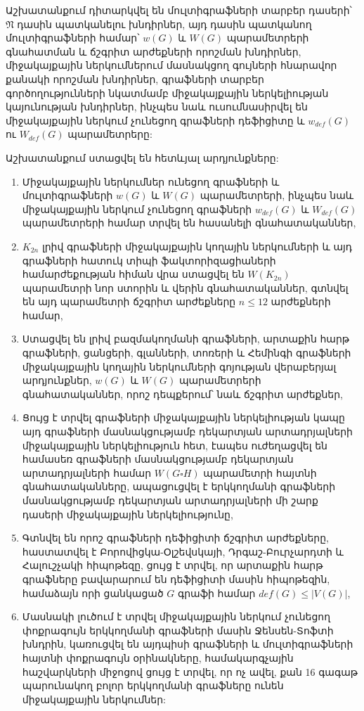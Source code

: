 Աշխատանքում դիտարկվել են մուլտիգրաֆների տարբեր դասերի՝ $\mathfrak{N}$ դասին պատկանելու խնդիրներ, այդ դասին պատկանող մուլտիգրաֆների համար՝ $w(G)$ և $W(G)$ պարամետրերի գնահատման և ճշգրիտ արժեքների որոշման խնդիրներ, միջակայքային ներկումներում մասնակցող գույների հնարավոր քանակի որոշման խնդիրներ, գրաֆների տարբեր գործողությունների նկատմամբ միջակայքային ներկելիության կայունության խնդիրներ, ինչպես նաև ուսումնասիրվել են միջակայքային ներկում չունեցող գրաֆների դեֆիցիտը և $w_{def}(G)$ ու $W_{def}(G)$ պարամետրերը:

Աշխատանքում ստացվել են հետևյալ արդյունքները:
\begin{enumerate}
\itemsep0em 
\item Միջակայքային ներկումներ ունեցող գրաֆների և մուլտիգրաֆների $w(G)$ և $W(G)$ պարամետրերի, ինչպես նաև միջակայքային ներկում չունեցող գրաֆների $w_{def}(G)$ և $W_{def}(G)$ պարամետրերի համար տրվել են հասանելի գնահատականներ,

\item $K_{2n}$ լրիվ գրաֆների միջակայքային կողային ներկումների և այդ գրաֆների հատուկ տիպի ֆակտորիզացիաների համարժեքության հիման վրա ստացվել են  $W(K_{2n})$ պարամետրի նոր ստորին և վերին գնահատականներ, գտնվել են այդ պարամետրի ճշգրիտ արժեքները $n \leq 12$ արժեքների համար,

\item Ստացվել են լրիվ բազմակողմանի գրաֆների, արտաքին հարթ գրաֆների, ցանցերի, գլանների, տոռերի և Հեմինգի գրաֆների միջակայքային կողային ներկումների գոյության վերաբերյալ արդյունքներ, $w(G)$ և $W(G)$ պարամետրերի գնահատականներ, որոշ դեպքերում՝ նաև ճշգրիտ արժեքներ,

\item Ցույց է տրվել գրաֆների միջակայքային ներկելիության կապը այդ գրաֆների մասնակցությամբ դեկարտյան արտադրյալների միջակայքային ներկելիություն հետ, էապես ուժեղացվել են համասեռ գրաֆների մասնակցությամբ դեկարտյան արտադրյալների համար $W(G \square H)$ պարամետրի հայտնի գնահատականները, ապացուցվել է երկկողմանի գրաֆների մասնակցությամբ դեկարտյան արտադրյալների մի շարք դասերի միջակայքային ներկելիությունը,

\item Գտնվել են որոշ գրաֆների դեֆիցիտի ճշգրիտ արժեքները, հաստատվել է Բորովիցկա-Օլշեվսկայի, Դրգաշ-Բուրչարդտի և Հալուշչակի հիպոթեզը, ցույց է տրվել, որ արտաքին հարթ գրաֆները բավարարում են դեֆիցիտի մասին հիպոթեզին, համաձայն որի ցանկացած $G$ գրաֆի համար $def(G) \leq |V(G)|$,

\item Մասնակի լուծում է տրվել միջակայքային ներկում չունեցող փոքրագույն երկկողմանի գրաֆների մասին Ջենսեն-Տոֆտի խնդրին, կառուցվել են այդպիսի գրաֆների և մուլտիգրաֆների հայտնի փոքրագույն օրինակները, համակարգչային հաշվարկների միջոցով ցույց է տրվել, որ ոչ ավել, քան 16 գագաթ պարունակող բոլոր երկկողմանի գրաֆները ունեն միջակայքային ներկումներ:
\end{enumerate}